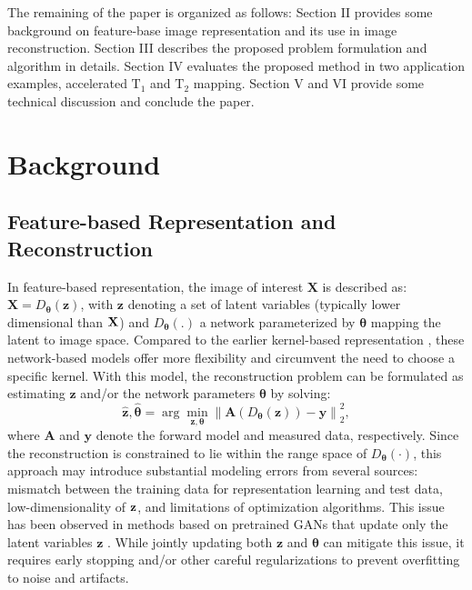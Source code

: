 \documentclass[journal,twoside,web]{ieeecolor}
\begin{document}
The remaining of the paper is organized as follows: Section
II provides some background on feature-base image representation and its use in image reconstruction. Section III describes the proposed problem formulation and algorithm in details. Section IV evaluates the proposed method in two application examples, accelerated $\text{T}_1$ and $\text{T}_2$ mapping. Section V and VI provide some
technical discussion and conclude the paper.


\section{Background}
\subsection{Feature-based Representation and Reconstruction}
In feature-based representation, the image of interest $\mathbf{X}$ is described as: $\mathbf{X} = D_{\boldsymbol{\theta}}(\mathbf{z})$, with $\mathbf{z}$ denoting a set of latent variables (typically lower dimensional than ${\mathbf X}$) and $D_{\boldsymbol{\theta}}(.)$ a network parameterized by $\boldsymbol{\theta}$ mapping the latent to image space. Compared to the earlier kernel-based representation \cite{wang2014pet,li2018constrained}, these network-based models offer more flexibility and circumvent the need to choose a specific kernel. With this model, the reconstruction problem can be formulated as estimating $\mathbf{z}$ and/or the network parameters $\boldsymbol{\theta}$ by solving:
\begin{equation}
\mathbf{\hat{z}},\boldsymbol{\hat{\theta}}=\arg\min _{\mathbf{z},\boldsymbol{\theta}} \left\|\mathbf{A}(D_{\boldsymbol{\theta}}(\mathbf{z}))-\mathbf{y}\right\|_2^2, 
\label{Background_recon}
\end{equation}
where $\mathbf{A}$ and $\mathbf{y}$ denote the forward model and measured data, respectively. Since the reconstruction is constrained to lie within the range space of $D_{\boldsymbol{\theta}}(\cdot)$, this approach may introduce substantial modeling errors from several sources: mismatch between the training data for representation learning and test data, low-dimensionality of ${\mathbf z}$, and limitations of optimization algorithms. This issue has been observed in methods based on pretrained GANs that update only the latent variables $\mathbf{z}$ \cite{bora2017compressed}. While jointly updating both $\mathbf{z}$ and $\boldsymbol{\theta}$ can mitigate this issue, it requires early stopping and/or other careful regularizations to prevent overfitting to noise and artifacts. 
\end{document}
